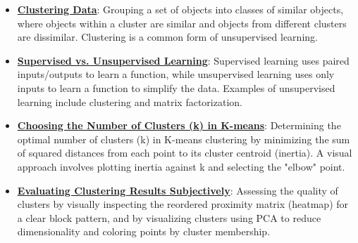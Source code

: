 \documentclass{article}%
\begin{document}
\begin{itemize}[leftmargin=*]%
\item \href{https://purdue.brightspace.com/d2l/common/assets/pdfjs-d2l-dist/1.0.14-legacy/web/viewer.html?file=%2Fcontent%2Fenforced%2F1095467-wl.202510.CS.24300.001%2F12L2-distance-clusters.pdf%3Fou%3D1095467&lang=en-us&container=d2l-fileviewer-rendered-pdf&fullscreen=d2l-fileviewer-rendered-pdf-dialog&height=667#page=4}{\textbf{Clustering Data}}: Grouping a set of objects into classes of similar objects, where objects within a cluster are similar and objects from different clusters are dissimilar. Clustering is a common form of unsupervised learning.%
\item \href{https://purdue.brightspace.com/d2l/common/assets/pdfjs-d2l-dist/1.0.14-legacy/web/viewer.html?file=%2Fcontent%2Fenforced%2F1095467-wl.202510.CS.24300.001%2F12L2-distance-clusters.pdf%3Fou%3D1095467&lang=en-us&container=d2l-fileviewer-rendered-pdf&fullscreen=d2l-fileviewer-rendered-pdf-dialog&height=667#page=3}{\textbf{Supervised vs. Unsupervised Learning}}: Supervised learning uses paired inputs/outputs to learn a function, while unsupervised learning uses only inputs to learn a function to simplify the data. Examples of unsupervised learning include clustering and matrix factorization.%
\item \href{https://purdue.brightspace.com/d2l/common/assets/pdfjs-d2l-dist/1.0.14-legacy/web/viewer.html?file=%2Fcontent%2Fenforced%2F1095467-wl.202510.CS.24300.001%2F12L2-distance-clusters.pdf%3Fou%3D1095467&lang=en-us&container=d2l-fileviewer-rendered-pdf&fullscreen=d2l-fileviewer-rendered-pdf-dialog&height=667#page=33}{\textbf{Choosing the Number of Clusters (k) in K{-}means}}: Determining the optimal number of clusters (k) in K-means clustering by minimizing the sum of squared distances from each point to its cluster centroid (inertia). A visual approach involves plotting inertia against k and selecting the "elbow" point.%
\item \href{https://purdue.brightspace.com/d2l/common/assets/pdfjs-d2l-dist/1.0.14-legacy/web/viewer.html?file=%2Fcontent%2Fenforced%2F1095467-wl.202510.CS.24300.001%2F12L2-distance-clusters.pdf%3Fou%3D1095467&lang=en-us&container=d2l-fileviewer-rendered-pdf&fullscreen=d2l-fileviewer-rendered-pdf-dialog&height=667#page=38}{\textbf{Evaluating Clustering Results Subjectively}}: Assessing the quality of clusters by visually inspecting the reordered proximity matrix (heatmap) for a clear block pattern, and by visualizing clusters using PCA to reduce dimensionality and coloring points by cluster membership.%

\end{itemize}
\end{document}
